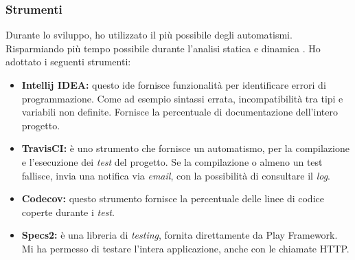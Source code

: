 \subsubsection{Strumenti}
Durante lo sviluppo, ho utilizzato il più possibile degli automatismi. Risparmiando più tempo possibile durante l'analisi statica e dinamica . Ho adottato i seguenti strumenti:
\begin{itemize}
\item \textbf{Intellij IDEA:} questo \gls{ide} fornisce funzionalità per identificare errori di programmazione. Come ad esempio sintassi errata, incompatibilità tra tipi e variabili non definite. Fornisce la percentuale di documentazione dell'intero progetto.
\item \textbf{TravisCI:} è uno strumento che fornisce un automatismo, per la compilazione e l'esecuzione dei \emph{test} del progetto. Se la compilazione o almeno un test fallisce, invia una notifica via \emph{email}, con la possibilità di consultare il \emph{log}.
\item \textbf{Codecov:} questo strumento fornisce la percentuale delle linee di codice coperte durante i \emph{test}.
\item \textbf{Specs2:} è una libreria di \emph{testing}, fornita direttamente da Play Framework. Mi ha permesso di testare l'intera applicazione, anche con le chiamate HTTP.
\end{itemize}
\newpage
